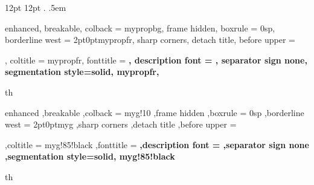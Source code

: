 {12pt} %
{12pt} %
{ \itshape} %
{} %
{\bfseries} %
{.} %
{.5em} %
{} %

\theoremstyle{simple}
\newtheorem{defnInternal}{Definition}[section]

\newenvironment{defn}[2]
{\begin{defnInternal}[#1]\label{def:#2}}
	{\end{defnInternal}}

{%
	enhanced,
	breakable,
	colback = mypropbg,
	frame hidden,
	boxrule = 0sp,
	borderline west = {2pt}{0pt}{mypropfr},
	sharp corners,
	detach title,
	before upper = \tcbtitle\par\smallskip,
	coltitle = mypropfr,
	fonttitle = \bfseries\sffamily,
	description font = \mdseries,
	separator sign none,
	segmentation style={solid, mypropfr},
}
{th}


{%
	enhanced
	,breakable
	,colback = myg!10
	,frame hidden
	,boxrule = 0sp
	,borderline west = {2pt}{0pt}{myg}
	,sharp corners
	,detach title
	,before upper = \tcbtitle\par\smallskip
	,coltitle = myg!85!black
	,fonttitle = \bfseries\sffamily
	,description font = \mdseries
	,separator sign none
	,segmentation style={solid, myg!85!black}
}
{th}




\makeatletter
{}
\makeatother


